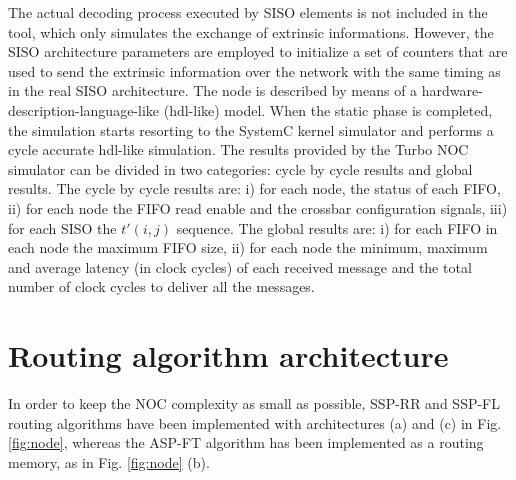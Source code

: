 \documentclass[10pt,twocolumn,journal]{IEEEtran}
\begin{document}
The actual decoding process executed by SISO elements is not included in the tool, which only simulates the exchange of 
extrinsic informations. However, 
the SISO architecture parameters are employed to initialize a set of counters that are used to send the extrinsic 
information over the network with the same timing as in the real SISO architecture. 
The node is described by means of 
a hardware-description-language-like (hdl-like) model. 
When the static phase is completed, the simulation starts resorting to the SystemC kernel simulator and  
performs a cycle accurate hdl-like simulation.
The results provided by the Turbo NOC simulator can be divided in two categories: 
cycle by cycle results and global results.
The cycle by cycle results are: i) for each node, the status of each FIFO, ii) for each node 
the FIFO read enable and the crossbar configuration signals, iii) for each SISO the $t'(i,j)$ sequence. 
The global results are: i) for each FIFO in each node the maximum FIFO size, ii) for each node the minimum, maximum 
and average latency (in clock cycles) of each received message and the total number of clock cycles to deliver all the 
messages.

\section{Routing algorithm architecture}
\label{sec:routing_algo_arch}

In order to keep the NOC complexity as small as possible, SSP-RR and SSP-FL routing algorithms have been 
implemented with architectures (a) and (c) in Fig. \ref{fig:node}, whereas the ASP-FT algorithm has been implemented 
as a routing memory, as in Fig. \ref{fig:node} (b). 
\end{document}
